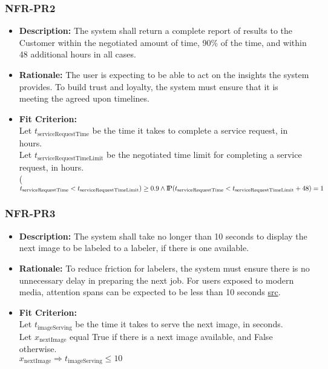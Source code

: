 \documentclass[12pt]{article}
\newcommand{\probP}{\text{I\kern-0.15em P}}
\begin{document}
\subsubsection*{NFR-PR2}
\begin{itemize}
  \item \textbf{Description:} The system shall return a complete report of results to the Customer within the negotiated amount of time, 90\% of the time, and within 48 additional hours in all cases.
  \item \textbf{Rationale:} The user is expecting to be able to act on the insights the system provides. To build trust and loyalty, the system must ensure that it is meeting the agreed upon timelines.
  \item \textbf{Fit Criterion:}\\ Let $t_{\text{serviceRequestTime}}$ be the time it takes to complete a service request, in hours.\\
  Let $t_{\text{serviceRequestTimeLimit}}$ be the negotiated time limit for completing a service request, in hours.\\ \probP($t_{\text{serviceRequestTime}} < t_{\text{serviceRequestTimeLimit}}) \geq 0.9\\ \wedge \probP(t_{\text{serviceRequestTime}} < t_{\text{serviceRequestTimeLimit}}+48) = 1 $
\end{itemize}

\subsubsection*{NFR-PR3}
\begin{itemize}
  \item \textbf{Description:} The system shall take no longer than 10 seconds to display the next image to be labeled to a labeler, if there is one available.
  \item \textbf{Rationale:} To reduce friction for labelers, the system must ensure there is no unnecessary delay in preparing the next job. For users exposed to modern media, attention spans can be expected to be less than 10 seconds \href{https://profiletree.com/attention-span-crisis-digital-age-statistics/#:~:text=Studies%20have%20proven%20that%20being,focus%20after%208%20mere%20seconds}{src}.
  \item \textbf{Fit Criterion:}\\ Let $t_{\text{imageServing}}$ be the time it takes to serve the next image, in seconds.\\
  Let $x_{\text{nextImage}}$ equal True if there is a next image available, and False otherwise.\\
  $x_{\text{nextImage}} \Rightarrow t_{\text{imageServing}} \leq 10$
\end{itemize}
\end{document}
